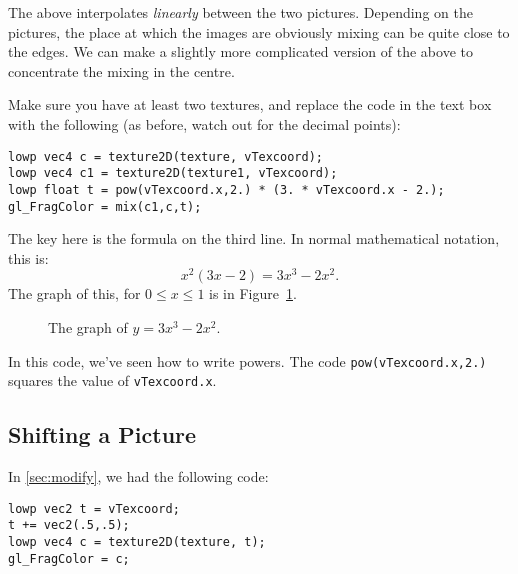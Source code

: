 \documentclass[
  html5,%
  mathml,%
  use filename%
]{internet}
\let\origtikzsetnextfilename\tikzsetnextfilename
\def\tikzsetnextfilename#1{%
  \origtikzsetnextfilename{#1}
  \mysetlabel{#1}
}
\newcommand{\mysetlabel}[1]{%
  \gdef\mynextlabel{#1}}
\newcommand{\autolabel}{%
  \label{fig:\mynextlabel}
  \global\let\mynextlabel\relax
}
\begin{document}
The above interpolates \emph{linearly} between the two pictures.
Depending on the pictures, the place at which the images are obviously mixing can be quite close to the edges.
We can make a slightly more complicated version of the above to concentrate the mixing in the centre.

Make sure you have at least two textures, and replace the code in the text box with the following (as before, watch out for the decimal points):

\begin{tcolorbox}
\begin{verbatim}
lowp vec4 c = texture2D(texture, vTexcoord);
lowp vec4 c1 = texture2D(texture1, vTexcoord);
lowp float t = pow(vTexcoord.x,2.) * (3. * vTexcoord.x - 2.);
gl_FragColor = mix(c1,c,t);
\end{verbatim}
\end{tcolorbox}

The key here is the formula on the third line.
In normal mathematical notation, this is:
%
\[
  x^2 (3 x - 2) = 3 x^3 - 2 x^2.
  \]
%
The graph of this, for \(0 \le x \le 1\) is in Figure~\ref{fig:smoothstep}.

\begin{figure}
\centering
{}
\caption{The graph of \(y = 3 x^3 - 2 x^2\).}
\autolabel
\end{figure}

In this code, we've seen how to write powers.
The code \verb!pow(vTexcoord.x,2.)! squares the value of \verb!vTexcoord.x!.

\subsection{Shifting a Picture}

In \ref{sec:modify}, we had the following code:

\begin{tcolorbox}
\begin{verbatim}
lowp vec2 t = vTexcoord;
t += vec2(.5,.5);
lowp vec4 c = texture2D(texture, t);
gl_FragColor = c;
\end{verbatim}
\end{tcolorbox}
\end{document}
